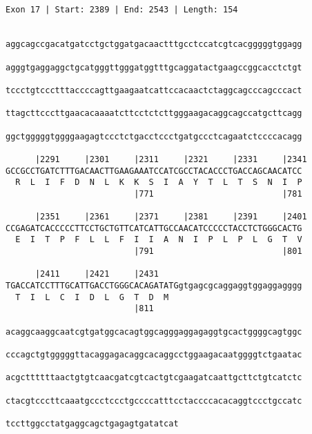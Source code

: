 \documentclass{article}
\begin{document}
\begin{Verbatim}
                                                 
 
Exon 17 | Start: 2389 | End: 2543 | Length: 154


aggcagccgacatgatcctgctggatgacaactttgcctccatcgtcacgggggtggagg
                                                            
agggtgaggaggctgcatgggttgggatggtttgcaggatactgaagccggcacctctgt
                                                            
tccctgtccctttaccccagttgaagaatcattccacaactctaggcagcccagcccact
                                                            
ttagcttcccttgaacacaaaatcttcctctcttgggaagacaggcagccatgcttcagg
                                                            
ggctgggggtggggaagagtccctctgacctccctgatgccctcagaatctccccacagg
                                                            
      |2291     |2301     |2311     |2321     |2331     |2341
GCCGCCTGATCTTTGACAACTTGAAGAAATCCATCGCCTACACCCTGACCAGCAACATCC
  R  L  I  F  D  N  L  K  K  S  I  A  Y  T  L  T  S  N  I  P
                          |771                          |781
  
      |2351     |2361     |2371     |2381     |2391     |2401
CCGAGATCACCCCCTTCCTGCTGTTCATCATTGCCAACATCCCCCTACCTCTGGGCACTG
  E  I  T  P  F  L  L  F  I  I  A  N  I  P  L  P  L  G  T  V
                          |791                          |801
  
      |2411     |2421     |2431                             
TGACCATCCTTTGCATTGACCTGGGCACAGATATGgtgagcgcaggaggtggaggagggg
  T  I  L  C  I  D  L  G  T  D  M                           
                          |811                              
  
acaggcaaggcaatcgtgatggcacagtggcagggaggagaggtgcactggggcagtggc
                                                            
cccagctgtgggggttacaggagacaggcacaggcctggaagacaatggggtctgaatac
                                                            
acgcttttttaactgtgtcaacgatcgtcactgtcgaagatcaattgcttctgtcatctc
                                                            
ctacgtcccttcaaatgccctccctgccccatttcctaccccacacaggtccctgccatc
                                                            
tccttggcctatgaggcagctgagagtgatatcat
                                   

\end{Verbatim}
\end{document}
